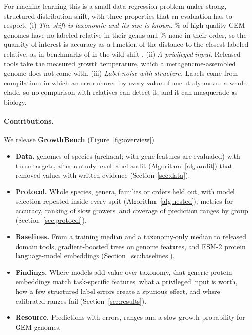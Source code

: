 \documentclass{article}
\begin{document}
For machine learning this is a small-data regression problem under strong, structured distribution shift, with three properties that an evaluation has to respect. (i) \emph{The shift is taxonomic and its size is known.}
\GEMShareNoGenus\% of high-quality GEM genomes have no labeled relative in their genus and \GEMShareNewOrder\% none in their
order, so the quantity of interest is accuracy as a function of the distance to the closest labeled relative, as in
benchmarks of in-the-wild shift \citep{koh2021}. (ii) \emph{A privileged input.} Released tools take the measured growth
temperature, which a metagenome-assembled genome does not come with. (iii) \emph{Label noise with structure.} Labels come
from compilations in which an error shared by every value of one study moves a whole clade, so no comparison with relatives
can detect it, and it can masquerade as biology.

\paragraph{Contributions.} We release \textbf{GrowthBench} (Figure~\ref{fig:overview}):
\begin{itemize}
\item \textbf{Data.} \NGenomes genomes of \NSpecies species (\NArchaea archaeal; \NHeadlineRows with gene features
are evaluated) with three targets, after a study-level
label audit (Algorithm~\ref{alg:audit}) that removed \NExcluded values with written evidence (Section~\ref{sec:data}).
\item \textbf{Protocol.} Whole species, genera, families or orders held out, with model selection repeated inside every
split (Algorithm~\ref{alg:nested}); metrics for accuracy, ranking of slow growers, and coverage of prediction ranges by
group (Section~\ref{sec:protocol}).
\item \textbf{Baselines.} From a training median and a taxonomy-only median to released domain tools, gradient-boosted
trees on genome features, and ESM-2 protein language-model embeddings \citep{lin2023} (Section~\ref{sec:baselines}).
\item \textbf{Findings.} Where models add value over taxonomy, that generic protein embeddings match task-specific
features, what a privileged input is worth, how a few structured label errors create a spurious effect, and where
calibrated ranges fail (Section~\ref{sec:results}).
\item \textbf{Resource.} Predictions with errors, ranges and a slow-growth probability for \NGEMPredicted GEM genomes.
\end{itemize}
\end{document}
